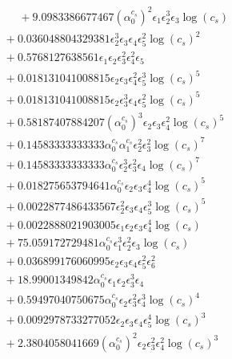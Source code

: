 \documentclass[10pt]{article}
\begin{document}
\begin{align*}
\phantom{F_{s,7}} &\phantom{={}}{}  + 9.0983386677467 \left(\alpha_{0}^{c_s}\right)^{2} \epsilon_{1} \epsilon_{2}^{3} \epsilon_{3} \log{\left(c_{s} \right)} \\
&{}  + 0.036048804329381 \epsilon_{2}^{3} \epsilon_{3} \epsilon_{4} \epsilon_{5}^{2} \log{\left(c_{s} \right)}^{2} \\
&{}  + 0.5768127638561 \epsilon_{1} \epsilon_{2} \epsilon_{3}^{2} \epsilon_{4}^{2} \epsilon_{5} \\
&{}  + 0.018131041008815 \epsilon_{2} \epsilon_{3} \epsilon_{4}^{2} \epsilon_{5}^{3} \log{\left(c_{s} \right)}^{5} \\
&{}  + 0.018131041008815 \epsilon_{2} \epsilon_{3}^{3} \epsilon_{4} \epsilon_{5}^{2} \log{\left(c_{s} \right)}^{5} \\
&{}  + 0.58187407884207 \left(\alpha_{0}^{c_s}\right)^{3} \epsilon_{2} \epsilon_{3} \epsilon_{4}^{2} \log{\left(c_{s} \right)}^{5} \\
&{}  + 0.14583333333333 \alpha_{0}^{c_s} \alpha_{1}^{c_s} \epsilon_{2}^{2} \epsilon_{3}^{2} \log{\left(c_{s} \right)}^{7} \\
&{}  + 0.14583333333333 \alpha_{0}^{c_s} \epsilon_{2}^{3} \epsilon_{3}^{2} \epsilon_{4} \log{\left(c_{s} \right)}^{7} \\
&{}  + 0.018275653794641 \alpha_{0}^{c_s} \epsilon_{2} \epsilon_{3} \epsilon_{4}^{4} \log{\left(c_{s} \right)}^{5} \\
&{}  + 0.0022877486433567 \epsilon_{2}^{2} \epsilon_{3} \epsilon_{4} \epsilon_{5}^{3} \log{\left(c_{s} \right)}^{5} \\
&{}  + 0.0022888021903005 \epsilon_{1} \epsilon_{2} \epsilon_{3} \epsilon_{4}^{4} \log{\left(c_{s} \right)} \\
&{}  + 75.059172729481 \alpha_{0}^{c_s} \epsilon_{1}^{3} \epsilon_{2}^{2} \epsilon_{3} \log{\left(c_{s} \right)} \\
&{}  + 0.036899176060995 \epsilon_{2} \epsilon_{3} \epsilon_{4} \epsilon_{5}^{2} \epsilon_{6}^{2} \\
&{}  + 18.99001349842 \alpha_{0}^{c_s} \epsilon_{1} \epsilon_{2} \epsilon_{3}^{3} \epsilon_{4} \\
&{}  + 0.59497040750675 \alpha_{0}^{c_s} \epsilon_{2} \epsilon_{3}^{2} \epsilon_{4}^{3} \log{\left(c_{s} \right)}^{4} \\
&{}  + 0.0092978733277052 \epsilon_{2} \epsilon_{3} \epsilon_{4} \epsilon_{5}^{4} \log{\left(c_{s} \right)}^{3} \\
&{}  + 2.3804058041669 \left(\alpha_{0}^{c_s}\right)^{2} \epsilon_{2} \epsilon_{3}^{2} \epsilon_{4}^{2} \log{\left(c_{s} \right)}^{3} \\

\end{align*}
\end{document}
